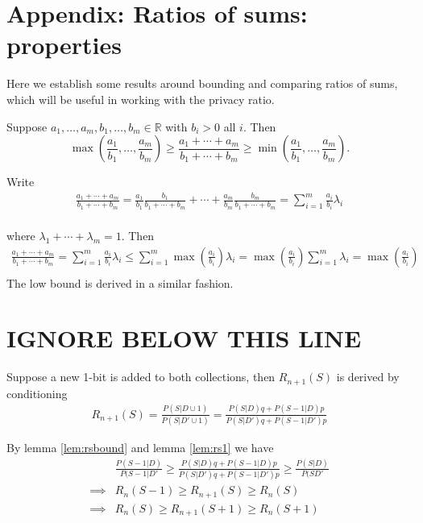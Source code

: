 \documentclass[11pt]{article}
\newcommand{\R}{\mathbb{R}}
\begin{document}

\section{Appendix: Ratios of sums: properties}

Here we establish some results around bounding and comparing ratios of sums, which will be useful in working with the privacy ratio.


\begin{lem} \label{lem:rsbound}
Suppose $a_1,\dots,a_m,b_1,\dots,b_m \in \R$ with $b_i > 0$ all $i$.
Then 
\[ \max\left(\frac{a_1}{b_1},\dots,\frac{a_m}{b_m}\right) \geq  \frac{a_1 + \cdots + a_m}{b_1 + \cdots + b_m} \geq \min \left(\frac{a_1}{b_1},\dots,\frac{a_m}{b_m}\right). \]
\end{lem}
\begin{pf}
Write
 \begin{align*}
  \frac{a_1 + \cdots + a_m}{b_1 + \cdots + b_m}
= \frac{a_1}{b_1}\frac{b_1}{b_1+\cdots+b_m} +
\cdots + \frac{a_m}{b_m}\frac{b_m}{b_1+\cdots+b_m} = \sum_{i=1}^m \frac{a_i}{b_i} \lambda_i  \\ 
\end{align*}

where $\lambda_1 + \cdots + \lambda_m = 1$.  Then
 \begin{align*}
  \frac{a_1 + \cdots + a_m}{b_1 + \cdots + b_m} = \sum_{i=1}^m \frac{a_i}{b_i} \lambda_i  \leq  \sum_{i=1}^m \max \left ( \frac{a_i}{b_i} \right ) \lambda_i  = \max \left ( \frac{a_i}{b_i} \right ) \sum_{i=1}^m \lambda_i = \max \left ( \frac{a_i}{b_i} \right ) \\ 
\end{align*}
The low bound is derived in a similar fashion. 
\end{pf}


 \newpage
 \section{IGNORE BELOW THIS LINE}
 
 Suppose a new 1-bit is added to both collections, then $R_{n+1}(S)$ is derived by conditioning
 \begin{align*}
R_{n+1}(S) = \frac{ P(S|D \cup 1) }{ P(S|D' \cup 1) } = \frac { P(S|D)q + P(S-1|D)p } { P(S|D')q + P(S-1|D')p}
\end{align*}
 
By lemma \eqref{lem:rsbound} and lemma  \eqref{lem:rs1} we have
\begin{align}
 & \frac{P(S-1|D)}{P(S-1|D'} \ge  \frac { P(S|D)q + P(S-1|D)p } { P(S|D')q + P(S-1|D')p} \ge \frac{P(S|D)}{P(SD'} \\
\implies & R_n(S-1) \ge R_{n+1}(S) \ge R_n(S) \\
\implies & R_n(S) \ge R_{n+1}(S+1) \ge R_n(S+1) \label{lem:rsb2}
\end{align}
 
\end{document}
